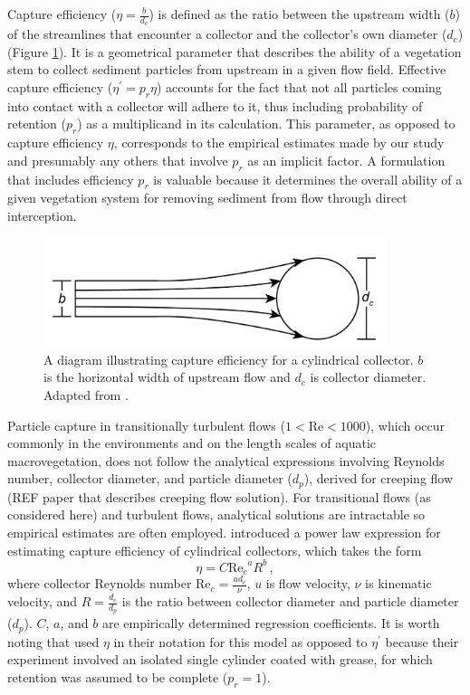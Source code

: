 \documentclass{scrreprt}
\newcommand\Rey{\mathrm{Re}}
\begin{document}
Capture efficiency ($\eta=\frac{b}{d_c}$) is defined as the ratio between the upstream width ($b$) of the streamlines that encounter a collector and the collector's own diameter ($d_c$) (Figure \ref{fig:capeff}). It is a geometrical parameter that describes the ability of a vegetation stem to collect sediment particles from upstream in a given flow field. Effective capture efficiency ($\eta^\prime=p_r\eta$) accounts for the fact that not all particles coming into contact with a collector will adhere to it, thus including probability of retention ($p_r$) as a multiplicand in its calculation. This parameter, as opposed to capture efficiency $\eta$, corresponds to the empirical estimates made by our study and presumably any others that involve $p_r$ as an implicit factor. A formulation that includes efficiency $p_r$ is valuable because it determines the overall ability of a given vegetation system for removing sediment from flow through direct interception.

\begin{figure}[htbp]
\includegraphics[width=10cm]{collectorefficiency.png}
\centering
\caption{A diagram illustrating capture efficiency for a cylindrical collector. $b$ is the horizontal width of upstream flow and $d_c$ is collector diameter. Adapted from \cite{Palmer_2004}.}
\label{fig:capeff}
\end{figure}

Particle capture in transitionally turbulent flows ($1<\Rey<1000$), which occur commonly in the environments and on the length scales of aquatic macrovegetation, does not follow the analytical expressions involving Reynolds number, collector diameter, and particle diameter ($d_p$), derived for creeping flow (REF paper that describes creeping flow solution). For transitional flows (as considered here) and turbulent flows, analytical solutions are intractable so empirical estimates are often employed. \cite{Palmer_2004} introduced a power law expression for estimating capture efficiency of cylindrical collectors, which takes the form 
\begin{equation}
    \eta=C{\Rey_c}^{a}R^{b}\,,
    \label{eq:powerlaw}
\end{equation}
where collector Reynolds number $\Rey_c=\frac{ud_c}{\nu}$, $u$ is flow velocity, $\nu$ is kinematic velocity, and $R=\frac{d_c}{d_p}$ is the ratio between collector diameter and particle diameter ($d_p$). $C$, $a$, and $b$ are empirically determined regression coefficients. It is worth noting that \cite{Palmer_2004} used $\eta$ in their notation for this model as opposed to $\eta^\prime$ because their experiment involved an isolated single cylinder coated with grease, for which retention was assumed to be complete ($p_r = 1$).
\end{document}
